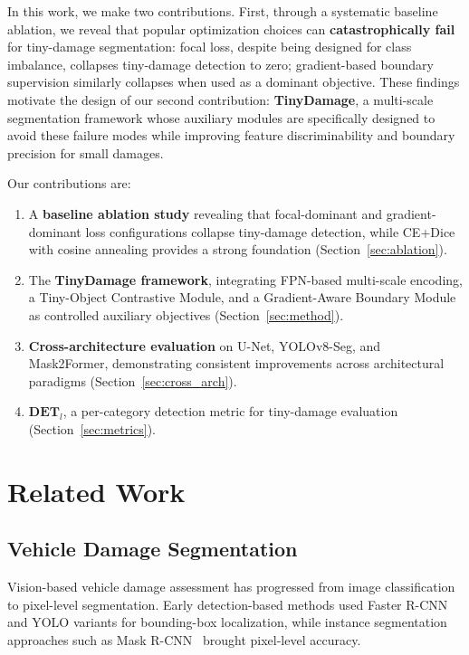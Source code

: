 \documentclass[10pt,twocolumn]{article}
\begin{document}
In this work, we make two contributions. First, through a systematic baseline ablation, we reveal that popular optimization choices can \textbf{catastrophically fail} for tiny-damage segmentation: focal loss, despite being designed for class imbalance, collapses tiny-damage detection to zero; gradient-based boundary supervision similarly collapses when used as a dominant objective. These findings motivate the design of our second contribution: \textbf{TinyDamage}, a multi-scale segmentation framework whose auxiliary modules are specifically designed to avoid these failure modes while improving feature discriminability and boundary precision for small damages.

Our contributions are:
\begin{enumerate}
    \item A \textbf{baseline ablation study} revealing that focal-dominant and gradient-dominant loss configurations collapse tiny-damage detection, while CE+Dice with cosine annealing provides a strong foundation (Section~\ref{sec:ablation}).
    \item The \textbf{TinyDamage framework}, integrating FPN-based multi-scale encoding, a Tiny-Object Contrastive Module, and a Gradient-Aware Boundary Module as controlled auxiliary objectives (Section~\ref{sec:method}).
    \item \textbf{Cross-architecture evaluation} on U-Net, YOLOv8-Seg, and Mask2Former, demonstrating consistent improvements across architectural paradigms (Section~\ref{sec:cross_arch}).
    \item $\textbf{DET}_l$, a per-category detection metric for tiny-damage evaluation (Section~\ref{sec:metrics}).
\end{enumerate}

\section{Related Work}
\label{sec:related}

\subsection{Vehicle Damage Segmentation}

Vision-based vehicle damage assessment has progressed from image classification to pixel-level segmentation. Early detection-based methods used Faster R-CNN and YOLO variants for bounding-box localization, while instance segmentation approaches such as Mask R-CNN~\cite{he2017maskrcnn} brought pixel-level accuracy.
\end{document}
